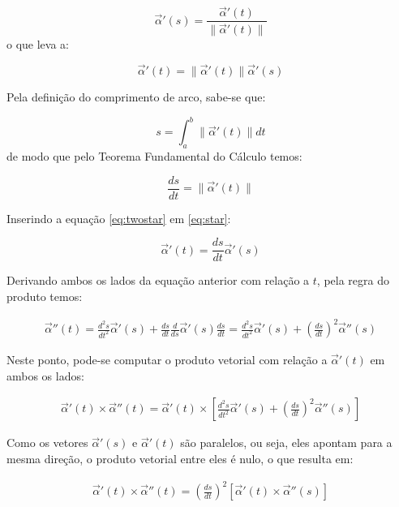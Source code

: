 \documentclass[a4paper,12pt]{article}
\begin{document}
\begin{equation}
	\vec{\alpha}'(s) = \frac{\vec{\alpha}'(t)}{\lVert \vec{\alpha}'(t) \rVert}
\end{equation} o que leva a:

\begin{equation}
	\vec{\alpha}'(t) = \lVert \vec{\alpha}'(t) \rVert \vec{\alpha}'(s)
	\label{eq:star}
\end{equation}

Pela definição do comprimento de arco, sabe-se que:

\begin{equation}
	s = \int_{a}^{b} \lVert \vec{\alpha}'(t) \rVert dt
\end{equation} de modo que pelo Teorema Fundamental do Cálculo temos:

\begin{equation}
	\frac{ds}{dt} = \lVert \vec{\alpha}'(t) \rVert
	\label{eq:twostar}
\end{equation}

Inserindo a equação \eqref{eq:twostar} em \eqref{eq:star}:

\begin{equation}
	\vec{\alpha}'(t) = \frac{ds}{dt} \vec{\alpha}'(s)
\end{equation}

Derivando ambos os lados da equação anterior com relação a $t$, pela regra do produto temos:

\begin{align}
	\vec{\alpha}''(t) = \frac{d^2 s}{dt^2} \vec{\alpha}'(s) + \frac{ds}{dt} \frac{d}{ds} \vec{\alpha}'(s) \frac{ds}{dt} = \frac{d^2 s}{dt^2} \vec{\alpha}'(s) + \left( \frac{ds}{dt} \right)^2 \vec{\alpha}''(s)
\end{align}

Neste ponto, pode-se computar o produto vetorial com relação a $\vec{\alpha}'(t)$ em ambos os lados:

\begin{align}
	\vec{\alpha}'(t) \times \vec{\alpha}''(t) = \vec{\alpha}'(t) \times \left[ \frac{d^2 s}{dt^2} \vec{\alpha}'(s) + \left( \frac{ds}{dt} \right)^2 \vec{\alpha}''(s) \right]
\end{align}

Como os vetores $\vec{\alpha}'(s)$ e $\vec{\alpha}'(t)$ são paralelos, ou seja, eles apontam para a mesma direção, o produto vetorial entre eles é nulo, o que resulta em:

\begin{align}
	\vec{\alpha}'(t) \times \vec{\alpha}''(t) = \left( \frac{ds}{dt} \right)^2 \left[ \vec{\alpha}'(t) \times \vec{\alpha}''(s) \right]
\end{align}
\end{document}
